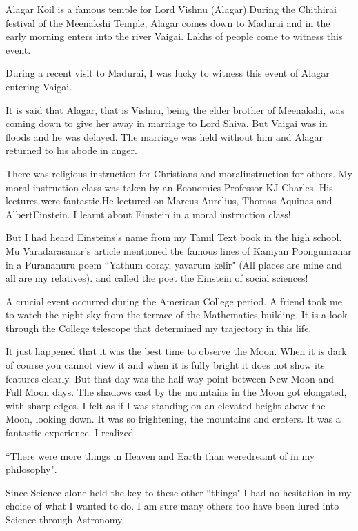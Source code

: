 Alagar Koil is a famous temple for Lord Vishnu (Alagar).\break During the 
Chithirai festival of the Meenakshi Temple, Alagar comes down to 
Madurai and in the early morning enters into the river Vaigai. Lakhs of 
people come to witness this event.

During a recent visit to Madurai, I was lucky to witness this event of 
Alagar entering Vaigai.

It is said that Alagar, that is Vishnu, being the elder brother of 
Meenakshi, was coming down to give her away in marriage to Lord Shiva. 
But Vaigai was in floods and he was delayed. The marriage was held 
without him and Alagar returned to his abode in anger.
 
There was religious instruction for Christians and moral\break instruction for 
others. My moral instruction class was taken by an Economics Professor 
KJ Charles. His lectures were fantastic.\break He lectured on Marcus Aurelius, 
Thomas Aquinas and Albert\break Einstein. I learnt about Einstein in a moral 
instruction class!

But I had heard Einsteins's name from my Tamil Text book in the high 
school. Mu Varadarasanar's article mentioned the famous lines of Kaniyan 
Poongunranar in a Purananuru poem ``Yathum ooray, yavarum kelir"
(All places are mine and all are my relatives).
and called the poet the Einstein of social sciences!   


A crucial event occurred during the American College period. A friend 
took me to watch the night sky from the terrace of the Mathematics 
building. It is a look through the College telescope that determined my 
trajectory in this life.


It just happened that it was the best time to observe the Moon. When it 
is dark of course you cannot view it and when it is fully bright it does 
not show its features clearly. But that day was the half-way point 
between New Moon and Full Moon days. The shadows cast by the mountains 
in the Moon got elongated, with sharp edges. I felt as if I was standing 
on an elevated height above the Moon, looking down. It was so 
frightening, the mountains and craters. It was a fantastic experience. I 
realized


``There were more things in Heaven and Earth than were\break dreamt of in my 
philosophy".


Since Science alone held the key to these other ``things" I had no 
hesitation in my choice of what I wanted to do. I am sure many others 
too have been lured into Science through Astronomy.


